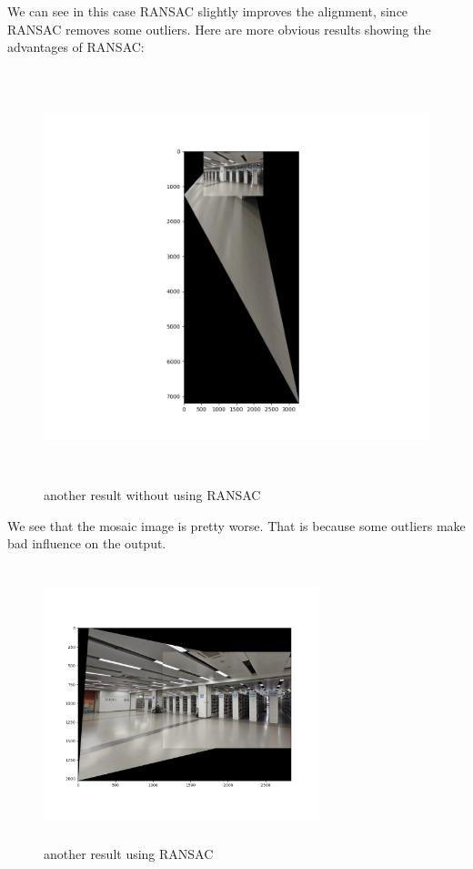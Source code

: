 \documentclass[a4paper,UTF8]{article}
\numberwithin{equation}{section}
\begin{document}
We can see in this case RANSAC slightly improves the alignment, since RANSAC removes some outliers.
Here are more obvious results showing the advantages of RANSAC:
\begin{figure}[H]
	\centering  %
	\includegraphics[width=12cm,height=12cm]{wo_RANSAC2.png}  %
	\caption{another result without using RANSAC}  %
\end{figure}
We see that the mosaic image is pretty worse. That is because some outliers make bad influence on the output.
\begin{figure}[H]
	\centering  %
	\includegraphics[width=8cm,height=8cm]{with_RANSAC2.png}  %
	\caption{another result using RANSAC}  %
\end{figure}


\end{document}
